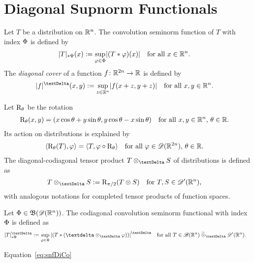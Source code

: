 \section{Diagonal Supnorm Functionals}
\label{dsnf}


Let $ T $ be a distribution on $ \mathbb{ R }^n $.
The convolution seminorm function of $ T $
with index $ \Phi $ is defined by \cite{KH022a,KH023,kle024}
\begin{align}
    \lvert  T  \rvert_{ \mathbin{*} \Phi }( x )
    &:=
    \sup_{\varphi\in\Phi}\lvert  ( T * \varphi )( x )  \rvert
    &&\text{for all $ x \in \mathbb{ R }^n $.}
\end{align}
The {\em diagonal cover} of a function $ f \colon \mathbb{ R }^{2n} \to \mathbb{ R } $
is defined by
\begin{align}
    \absDi{ f }( x, y )
    :=
    \sup_{z\in\nrR^n}\abs{ f( x + z, y + z ) }
    &&&\text{for all $ x, y \in \nrR^n $.}
\end{align}

Let $ \mathrm{ R }_{\theta} $ be the rotation
\begin{align}
    \mathrm{ R }_{\theta}( x, y )
    &=
    ( x\cos\theta + y\sin\theta, y\cos\theta - x\sin\theta )
    &&\text{for all $ x,y \in \mathbb{ R }^n $, $ \theta \in \mathbb{ R } $.}
\end{align}
Its action on distributions is explained by
\begin{align}
    \langle  \mathrm{ R }_\theta( T )  ,  \varphi  \rangle
    &=
    \langle  T  ,  \varphi \circ \mathrm{ R }_\theta  \rangle
    &&\text{for all $ \varphi \in \mathscr{  D  }( \mathbb{ R }^{2n} ) $, $ \theta \in \mathbb{ R } $.}
\end{align}
The diagonal-codiagonal tensor product $ T \teproDi S $
of distributions is defined as
\begin{align}
    T \teproDi S
    &:=
    \rmR_{\pi/2}( T \tepro S )
    &&\text{for $ T, S \in \fsDis( \nrR^n ) $,}
\end{align}
with analogous notations for completed tensor products of function spaces.

\begin{definition}
    Let $ \Phi \in \operatorname{\mathfrak{ B }}( \mathscr{  D  }( \mathbb{ R }^n ) ) $.
    The codiagonal convolution seminorm functional with index $ \Phi $
    is defined as 
    \begin{align}
        \snfDiCo{ T }{ \Ph }
        &:=
        \sup_{ \ph \in \Ph }\AbsDi{ ( T * ( \sfdeo \teproDi \ph ) ) }
        &&\text{for all $ T \in \fsSmobnd(\nrR^n) \cteproDi \fsDis(\nrR^n) $.}
        \label{eq:snfDiCo}
    \end{align}
\end{definition}

\begin{lemma}
    Equation~\eqref{eq:snfDiCo}
\end{lemma}


